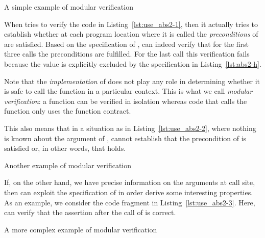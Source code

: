 \begin{listing}[hbt]
\begin{minipage}{\textwidth}

\end{minipage}
\caption{\label{lst:use_abs2-1} A simple example of modular verification}
\end{listing}

\FloatBarrier

When \framacwp tries to verify the code in Listing~\ref{lst:use_abs2-1},
then it actually tries to establish whether at each program location where
it is called the \emph{preconditions} of  are satisfied.
Based on the specification of ,
\framacwp can indeed verify that for the first three calls the preconditions are fulfilled.
For the last call this verification fails because the value 
is explicitly excluded by the specification in Listing~\ref{lst:abs2-h}.

Note that the \emph{implementation} of 
does not play any role in determining whether it is safe to
call the function in a particular context.
This is what we call \emph{modular verification}: a function can be verified in
isolation whereas code that calls the function only uses the function contract.

This also means that in a situation as in Listing~\ref{lst:use_abs2-2},
where nothing is known about the argument of , 
\framacwp cannot establish that the precondition of  is satisfied
or, in other words, that  holds.

\begin{listing}[hbt]
\begin{minipage}{\textwidth}

\end{minipage}
\caption{\label{lst:use_abs2-2} Another example of modular verification}
\end{listing}

\clearpage

If, on the other hand, we have precise information on the arguments at call site, then \framacwp can exploit the specification of 
 in order derive some interesting properties.
As an example, we consider the code fragment in Listing~\ref{lst:use_abs2-3}.
Here, \framacwp can verify that the assertion after 
the call of  is correct.


\begin{listing}[hbt]
\begin{minipage}{\textwidth}

\end{minipage}
\caption{\label{lst:use_abs2-3} A more complex example of modular verification}
\end{listing}

